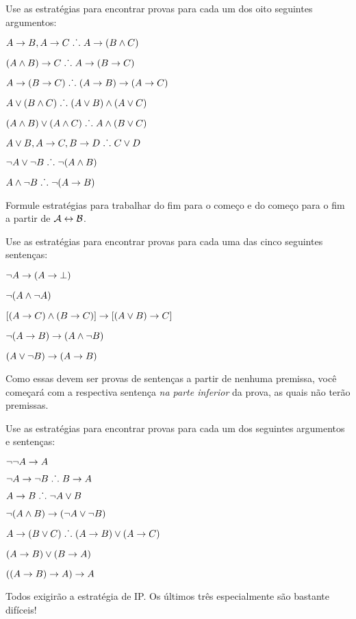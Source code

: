 
\practiceproblems

\problempart
Use as estrat\'egias  para encontrar provas para cada um dos oito seguintes argumentos:
\begin{earg}
\item $A \rightarrow B, A \rightarrow C \mathrel{\ldotp\dot{}\,\ldotp} A \rightarrow (B \wedge C)$
\item $(A \wedge B) \rightarrow C \mathrel{\ldotp\dot{}\,\ldotp} A \rightarrow (B \rightarrow C)$
\item $A \rightarrow (B \rightarrow C) \mathrel{\ldotp\dot{}\,\ldotp} (A \rightarrow B) \rightarrow (A \rightarrow C)$
\item $A \vee (B \wedge C) \mathrel{\ldotp\dot{}\,\ldotp} (A \vee B) \wedge (A \vee C)$
\item $(A \wedge B) \vee (A \wedge C) \mathrel{\ldotp\dot{}\,\ldotp} A \wedge (B \vee C)$
\item $A \vee B, A \rightarrow C, B \rightarrow D \mathrel{\ldotp\dot{}\,\ldotp} C \vee D$
\item $\neg A \lor \neg B \mathrel{\ldotp\dot{}\,\ldotp} \neg(A \wedge B)$
\item $A \wedge \neg B \mathrel{\ldotp\dot{}\,\ldotp} \neg(A \rightarrow B)$
\end{earg}

\problempart
Formule estrat\'egias para trabalhar do fim para o come\c co e do come\c co para o fim a partir de $\mathcal{A} \leftrightarrow \mathcal{B}$.

\problempart
Use as estrat\'egias para encontrar provas para cada uma das cinco seguintes senten\c cas:
\begin{earg}
\item $\neg A \rightarrow (A \rightarrow \bot)$
\item $\neg(A \wedge \neg A)$
\item $[(A \rightarrow C) \wedge (B \rightarrow C)] \rightarrow [(A \lor B) \rightarrow C]$
\item $\neg(A \rightarrow B) \rightarrow (A \wedge \neg B)$
\item $(A \vee \neg B) \rightarrow (A \rightarrow B)$
\end{earg}


Como essas devem ser provas de senten\c cas a partir de nenhuma premissa, voc\^e come\c car\'a com a respectiva senten\c ca \emph{na parte inferior} da prova, as quais n\~ao ter\~ao premissas.

\problempart
Use as estrat\'egias para encontrar provas para cada um dos seguintes argumentos e senten\c cas:
\begin{earg}
\item $\neg\neg A \rightarrow A$
\item $\neg A \rightarrow \neg B \mathrel{\ldotp\dot{}\,\ldotp} B \rightarrow A$
\item $A \rightarrow B \mathrel{\ldotp\dot{}\,\ldotp} \neg A \vee B$
\item $\neg(A \wedge B) \rightarrow (\neg A \vee \neg B)$
\item $A \rightarrow (B \vee C) \mathrel{\ldotp\dot{}\,\ldotp} (A \rightarrow B) \vee (A \rightarrow C)$
\item $(A \rightarrow B) \lor (B \rightarrow A)$
\item $((A \rightarrow B) \rightarrow A) \rightarrow A$
\end{earg}
Todos exigir\~ao a estrat\'egia de IP. Os \'ultimos tr\^es especialmente s\~ao bastante dif\'iceis!

